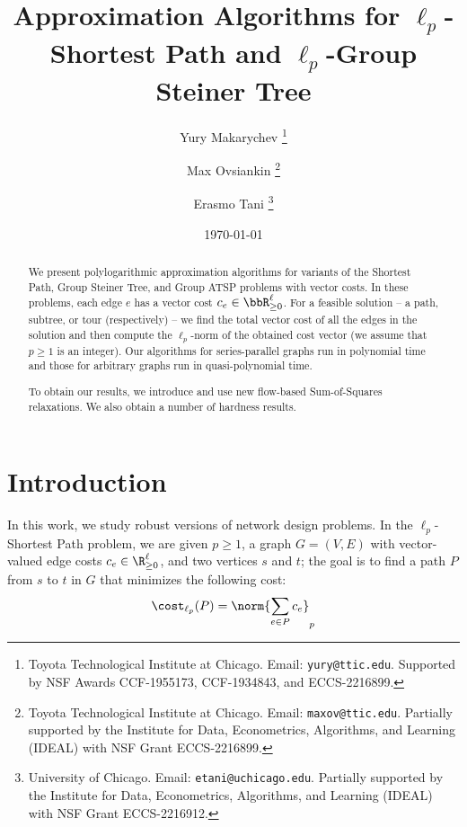 \documentclass[11pt,a4paper]{article}
\title{Approximation Algorithms for \(\ell_p\)-Shortest Path and \(\ell_p\)-Group Steiner Tree}
\author{Yury Makarychev%
\thanks{Toyota Technological Institute at Chicago. Email: \texttt{yury@ttic.edu}. Supported by NSF Awards CCF-1955173, CCF-1934843, and ECCS-2216899.}
\and Max Ovsiankin%
\thanks{Toyota Technological Institute at Chicago. Email: \texttt{maxov@ttic.edu}. Partially supported by the Institute for Data, Econometrics, Algorithms, and Learning (IDEAL) with NSF Grant ECCS-2216899.}
\and Erasmo Tani%
\thanks{University of Chicago. Email: \texttt{etani@uchicago.edu}. Partially supported by the Institute for Data, Econometrics, Algorithms, and Learning (IDEAL) with NSF Grant ECCS-2216912.}}
\date{\today}
\begin{document}
\maketitle
\begin{abstract}
We present polylogarithmic approximation algorithms for variants of the Shortest Path, Group Steiner Tree, and Group ATSP problems with vector costs. In these problems, each edge $e$ has a vector cost $c_e\in\bbR_{\geq 0}^\ell$. For a feasible solution -- a path, subtree, or tour (respectively) -- we find the total vector cost of all the edges in the solution and then compute the $\ell_p$-norm of the obtained cost vector (we assume that $p\geq 1$ is an integer). Our algorithms for series-parallel graphs run in polynomial time and those for arbitrary graphs run in quasi-polynomial time.

To obtain our results, we introduce and use new flow-based Sum-of-Squares relaxations. 
We also obtain a number of hardness results.
\end{abstract}

\newpage
\tableofcontents
\newpage

\section{Introduction}
In this work, we study robust versions of network design problems. In the $\ell_p$-Shortest Path problem, we are given \(p \ge 1\), a graph $G=(V,E)$ with vector-valued edge costs  $c_e\in  \R_{\geq 0}^{\ell}$, and two vertices $s$ and $t$; the goal is to find a path $P$ from $s$ to $t$ in $G$ that minimizes the following cost:
\[
    \cost_{\ell_p}(P) = \norm{\sum_{e\in P}c_e}_p
\]
\end{document}
